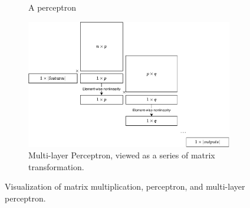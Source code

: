 \begin{figure}[t]
\begin{subfigure}[t]{0.45\textwidth}
    \caption{A perceptron}
    \label{fig:perceptron}
	\end{subfigure}
	\begin{subfigure}[b]{0.9\textwidth}
    \includegraphics[width=0.99\textwidth]{figures/deep_matmul.pdf}
    \caption{Multi-layer Perceptron, viewed as a series of matrix transformation.}
    \label{fig:deep_matmul}
	\end{subfigure}


  \caption{Visualization of matrix multiplication, perceptron, and multi-layer perceptron.}
\end{figure}
